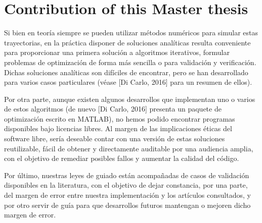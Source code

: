 \section{Contribution of this Master thesis} \label{sec:contribution}


Si bien en teoría siempre se pueden utilizar métodos numéricos para simular estas trayectorias, en la práctica disponer de soluciones analíticas resulta conveniente para proporcionar una primera solución a algoritmos iterativos, formular problemas de optimización de forma más sencilla o para validación y verificación. Dichas soluciones analíticas son difíciles de encontrar, pero se han desarrollado para varios casos particulares (véase [Di Carlo, 2016] para un resumen de ellos).

Por otra parte, aunque existen algunos desarrollos que implementan uno o varios de estos algoritmos (de nuevo [Di Carlo, 2016] presenta un paquete de optimización escrito en MATLAB), no hemos podido encontrar programas disponibles bajo licencias libres. Al margen de las implicaciones éticas del software libre, sería deseable contar con una versión de estas soluciones reutilizable, fácil de obtener y directamente auditable por una audiencia amplia, con el objetivo de remediar posibles fallos y aumentar la calidad del código.

Por último, nuestras leyes de guiado están acompañadas de casos de validación disponibles en la literatura, con el objetivo de dejar constancia, por una parte, del margen de error entre nuestra implementación y los artículos consultados, y por otro servir de guía para que desarrollos futuros mantengan o mejoren dicho margen de error.

\clearpage